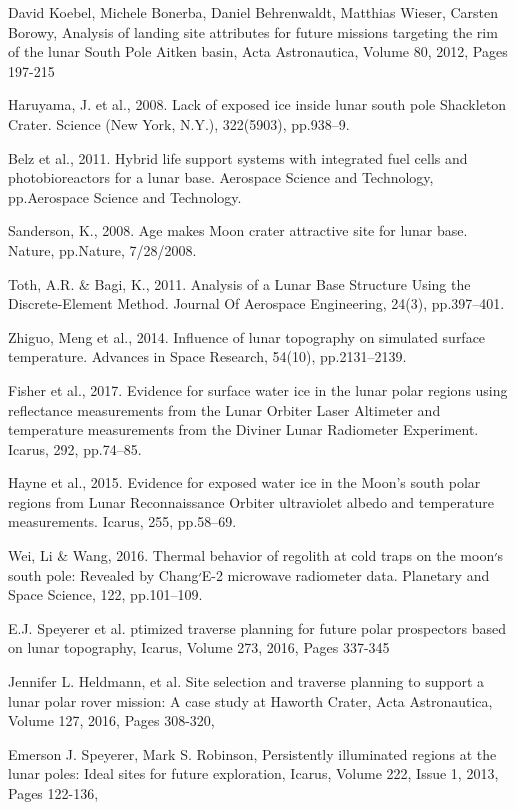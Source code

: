 \documentclass[prl,onecolumn]{revtex4-1}  %
\begin{document}
\begin{thebibliography}{99}
David Koebel, Michele Bonerba, Daniel Behrenwaldt, Matthias Wieser, Carsten Borowy,
Analysis of landing site attributes for future missions targeting the rim of the lunar South Pole Aitken basin,
Acta Astronautica,
Volume 80,
2012,
Pages 197-215

 Haruyama, J. et al., 2008. Lack of exposed ice inside lunar south pole Shackleton Crater. Science (New York, N.Y.), 322(5903), pp.938–9.


 Belz et al., 2011. Hybrid life support systems with integrated fuel cells and photobioreactors for a lunar base. Aerospace Science and Technology, pp.Aerospace Science and Technology.


 Sanderson, K., 2008. Age makes Moon crater attractive site for lunar base. Nature, pp.Nature, 7/28/2008.

Toth, A.R. \& Bagi, K., 2011. Analysis of a Lunar Base Structure Using the Discrete-Element Method. Journal Of Aerospace Engineering, 24(3), pp.397–401.

Zhiguo, Meng et al., 2014. Influence of lunar topography on simulated surface temperature. Advances in Space Research, 54(10), pp.2131–2139.


Fisher et al., 2017. Evidence for surface water ice in the lunar polar regions using reflectance measurements from the Lunar Orbiter Laser Altimeter and temperature measurements from the Diviner Lunar Radiometer Experiment. Icarus, 292, pp.74–85.


Hayne et al., 2015. Evidence for exposed water ice in the Moon’s south polar regions from Lunar Reconnaissance Orbiter ultraviolet albedo and temperature measurements. Icarus, 255, pp.58–69.

Wei, Li \& Wang, 2016. Thermal behavior of regolith at cold traps on the moon׳s south pole: Revealed by Chang׳E-2 microwave radiometer data. Planetary and Space Science, 122, pp.101–109.

E.J. Speyerer et al. ptimized traverse planning for future polar prospectors based on lunar topography, Icarus, Volume 273, 2016, Pages 337-345

Jennifer L. Heldmann, et al. Site selection and traverse planning to support a lunar polar rover mission: A case study at Haworth Crater,
Acta Astronautica, Volume 127, 2016, Pages 308-320,

Emerson J. Speyerer, Mark S. Robinson, Persistently illuminated regions at the lunar poles: Ideal sites for future exploration, Icarus, Volume 222, Issue 1, 2013, Pages 122-136,


\end{thebibliography}
\end{document}
